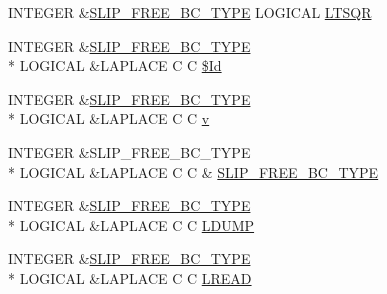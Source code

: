 \begin{DoxyCompactItemize}
\item 
I\-N\-T\-E\-G\-E\-R \&\hyperlink{home_2abonfi_2_c_f_d__codes_2_eul_f_s_83_84_2include_2flags_8com_a6beb6f16ff7301fc1f9a031b0f564045}{S\-L\-I\-P\-\_\-\-F\-R\-E\-E\-\_\-\-B\-C\-\_\-\-T\-Y\-P\-E} L\-O\-G\-I\-C\-A\-L \hyperlink{home_2abonfi_2_c_f_d__codes_2_eul_f_s_83_84_2include_2flags_8com_af9eac3cee045cc6d88e08005d02f153c}{L\-T\-S\-Q\-R}
\item 
I\-N\-T\-E\-G\-E\-R \&\hyperlink{home_2abonfi_2_c_f_d__codes_2_eul_f_s_83_84_2include_2flags_8com_a6beb6f16ff7301fc1f9a031b0f564045}{S\-L\-I\-P\-\_\-\-F\-R\-E\-E\-\_\-\-B\-C\-\_\-\-T\-Y\-P\-E} \\*
L\-O\-G\-I\-C\-A\-L \&L\-A\-P\-L\-A\-C\-E C C \hyperlink{home_2abonfi_2_c_f_d__codes_2_eul_f_s_83_84_2include_2flags_8com_ae60767b8a00a3d5b1a9e070e70af7b83}{\$\-Id}
\item 
I\-N\-T\-E\-G\-E\-R \&\hyperlink{home_2abonfi_2_c_f_d__codes_2_eul_f_s_83_84_2include_2flags_8com_a6beb6f16ff7301fc1f9a031b0f564045}{S\-L\-I\-P\-\_\-\-F\-R\-E\-E\-\_\-\-B\-C\-\_\-\-T\-Y\-P\-E} \\*
L\-O\-G\-I\-C\-A\-L \&L\-A\-P\-L\-A\-C\-E C C \hyperlink{home_2abonfi_2_c_f_d__codes_2_eul_f_s_83_84_2include_2flags_8com_a9432be5aaed9ef92777eb9334811a743}{v}
\item 
I\-N\-T\-E\-G\-E\-R \&S\-L\-I\-P\-\_\-\-F\-R\-E\-E\-\_\-\-B\-C\-\_\-\-T\-Y\-P\-E \\*
L\-O\-G\-I\-C\-A\-L \&L\-A\-P\-L\-A\-C\-E C C \& \hyperlink{home_2abonfi_2_c_f_d__codes_2_eul_f_s_83_84_2include_2flags_8com_a6beb6f16ff7301fc1f9a031b0f564045}{S\-L\-I\-P\-\_\-\-F\-R\-E\-E\-\_\-\-B\-C\-\_\-\-T\-Y\-P\-E}
\item 
I\-N\-T\-E\-G\-E\-R \&\hyperlink{home_2abonfi_2_c_f_d__codes_2_eul_f_s_83_84_2include_2flags_8com_a6beb6f16ff7301fc1f9a031b0f564045}{S\-L\-I\-P\-\_\-\-F\-R\-E\-E\-\_\-\-B\-C\-\_\-\-T\-Y\-P\-E} \\*
L\-O\-G\-I\-C\-A\-L \&L\-A\-P\-L\-A\-C\-E C C \hyperlink{home_2abonfi_2_c_f_d__codes_2_eul_f_s_83_84_2include_2flags_8com_a3024fd35afb70c44fa85042b6a14c5ab}{L\-D\-U\-M\-P}
\item 
I\-N\-T\-E\-G\-E\-R \&\hyperlink{home_2abonfi_2_c_f_d__codes_2_eul_f_s_83_84_2include_2flags_8com_a6beb6f16ff7301fc1f9a031b0f564045}{S\-L\-I\-P\-\_\-\-F\-R\-E\-E\-\_\-\-B\-C\-\_\-\-T\-Y\-P\-E} \\*
L\-O\-G\-I\-C\-A\-L \&L\-A\-P\-L\-A\-C\-E C C \hyperlink{home_2abonfi_2_c_f_d__codes_2_eul_f_s_83_84_2include_2flags_8com_aa6fefd93ca36a6424e6e72230960d44c}{L\-R\-E\-A\-D}
\end{DoxyCompactItemize}


